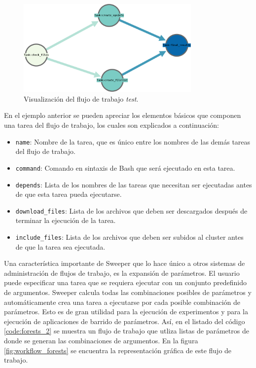 \begin{figure}
\begin{center}
\includegraphics[width=0.8\textwidth]{imagenes/workflow_test.png}
\end{center}
\caption{Visualización del flujo de trabajo \emph{test}.}
\label{fig:workflow_test}
\end{figure}


En el ejemplo anterior se pueden apreciar los elementos básicos que componen una tarea del flujo de trabajo, los cuales son explicados a continuación:


\begin{itemize}
\item{\texttt{name}: Nombre de la tarea, que es único entre los nombres de las demás tareas del flujo de trabajo.}
\item{\texttt{command}: Comando en sintaxis de Bash que será ejecutado en esta tarea.}
\item{\texttt{depends}: Lista de los nombres de las tareas que necesitan ser ejecutadas antes de que esta tarea pueda ejecutarse.}
\item{\texttt{download\_files}: Lista de los archivos que deben ser descargados después de terminar la ejecución de la tarea.}
\item{\texttt{include\_files}: Lista de los archivos que deben ser subidos al cluster antes de que la tarea sea ejecutada.}
\end{itemize}

Una característica importante de Sweeper que lo hace único a otros sistemas de administración de flujos de trabajo, es la expansión de parámetros. El usuario puede especificar una tarea que se requiera ejecutar con un conjunto predefinido de argumentos. Sweeper calcula todas las combinaciones posibles de parámetros y automáticamente crea una tarea a ejecutarse por cada posible combinaci\'on de parámetros. Esto es de gran utilidad para la ejecución de experimentos y para la ejecución de aplicaciones de barrido de parámetros. Así, en el listado del código \ref{code:forests_2} se muestra un flujo de trabajo que utliza listas de parámetros de donde se generan las combinaciones de argumentos. En la figura \ref{fig:workflow_forests} se encuentra la representación gr\'afica de este flujo de trabajo.

